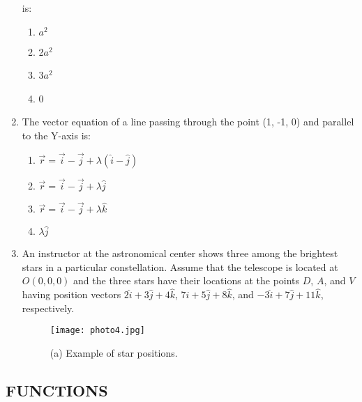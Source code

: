 \documentclass{article}
\begin{document}
\begin{enumerate}[label=\textbf{\arabic*.}]
    is:

    \begin{enumerate}[label=\alph*)] %
        \item \(a^2\)
        \item 2\(a^2\)
        \item 3\(a^2\)
        \item 0
    \end{enumerate}

    \item The vector equation of a line passing through the point (1, -1, 0) and parallel to the Y-axis is:

    \begin{enumerate}[label=\alph*)] %
        \item \( \overset{\rightarrow}{r} = \overset{\rightarrow}{i} - \overset{\rightarrow}{j} + \lambda (\hat{i} - \hat{j}) \)
        \item \( \overset{\rightarrow}{r} = \overset{\rightarrow}{i} - \overset{\rightarrow}{j} + \lambda \hat{j} \)
        \item \( \overset{\rightarrow}{r} = \overset{\rightarrow}{i} - \overset{\rightarrow}{j} + \lambda \hat{k} \)
        \item \( \lambda \hat{j} \)
    \end{enumerate}

    \item An instructor at the astronomical center shows three among the brightest stars in a particular constellation.
    Assume that the telescope is located at \( O(0,0,0) \) and the three stars have their locations at the points \( D \), \( A \), and \( V \) having position vectors \( 2 \hat{i} + 3 \hat{j} + 4 \hat{k} \), \( 7 \hat{i} + 5 \hat{j} + 8 \hat{k} \), and \( -3 \hat{i} + 7 \hat{j} + 11 \hat{k} \), respectively.

    \begin{figure}[h] %
        \centering
        \texttt{[image: photo4.jpg]} %
        \caption{(a) Example of star positions.}
        \label{fig:star-positions}
    \end{figure}

\end{enumerate}

\subsection*{FUNCTIONS}
\end{document}

